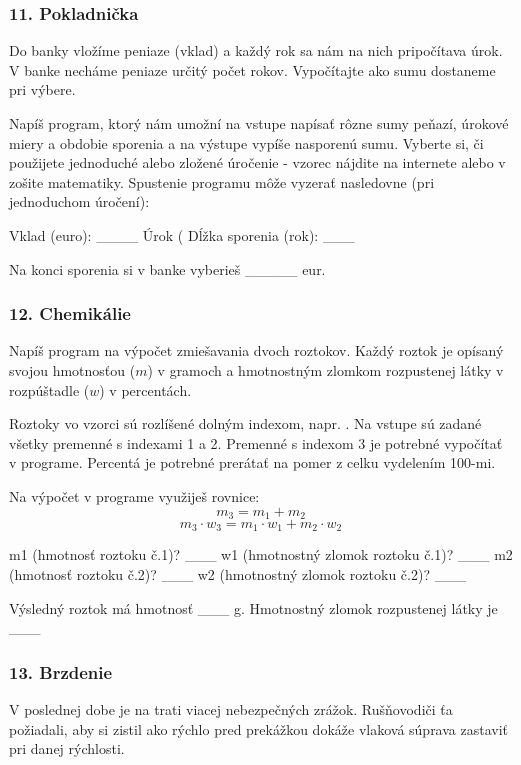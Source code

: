 \subsubsection*{11. Pokladnička}
Do banky vložíme peniaze (vklad)  a každý rok sa nám na nich pripočítava úrok. V banke necháme peniaze určitý počet rokov. Vypočítajte ako sumu dostaneme pri výbere.

Napíš program, ktorý nám umožní na vstupe napísať rôzne sumy peňazí, úrokové miery a obdobie sporenia a na výstupe vypíše nasporenú sumu. Vyberte si, či použijete jednoduché alebo zložené úročenie - vzorec nájdite na internete alebo v zošite matematiky. Spustenie programu môže vyzerať nasledovne (pri jednoduchom úročení):

\begin{code}
Vklad (euro): ____
Úrok (%
Dĺžka sporenia (rok): ___

Na konci sporenia si v banke vyberieš _____ eur.
\end{code}

\subsubsection*{12. Chemikálie}
Napíš program na výpočet zmiešavania dvoch roztokov. Každý roztok je opísaný svojou hmotnosťou ($m$) v gramoch a hmotnostným zlomkom rozpustenej látky v rozpúštadle ($w$) v percentách.
 
Roztoky vo vzorci sú rozlíšené dolným indexom, napr. . Na vstupe sú zadané všetky premenné s indexami 1 a 2. Premenné s indexom 3 je potrebné vypočítať v programe.  Percentá je potrebné prerátať na pomer z celku vydelením 
100-mi.

Na výpočet v programe využiješ rovnice:
$$m_3 = m_1 + m_2$$
$$m_3 \cdot w_3 = m_1 \cdot w_1 +  m_2 \cdot w_2$$

\begin{code}
m1 (hmotnosť roztoku č.1)? ___
w1 (hmotnostný zlomok roztoku č.1)? ___
m2 (hmotnosť roztoku č.2)? ___
w2 (hmotnostný zlomok roztoku č.2)? ___

Výsledný roztok má hmotnosť ___ g.
Hmotnostný zlomok rozpustenej látky je ___ %
\end{code}


\subsubsection*{13. Brzdenie}
V poslednej dobe je na trati viacej nebezpečných zrážok. Rušňovodiči ťa požiadali, aby si zistil ako rýchlo pred prekážkou dokáže vlaková súprava zastaviť pri danej rýchlosti.

